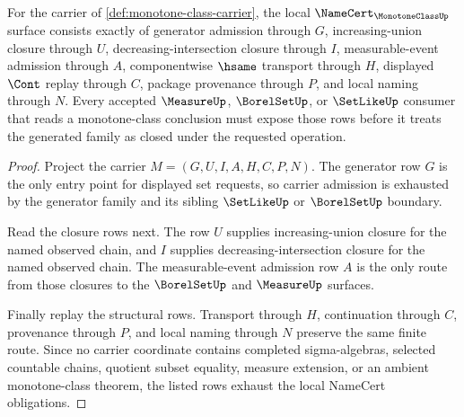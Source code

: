 \begin{theorem}
\label{thm:monotone-class-namecert-obligations}
For the carrier of \autoref{def:monotone-class-carrier}, the local $\NameCert_{\MonotoneClassUp}$ surface consists exactly of generator admission through $G$, increasing-union closure through $U$, decreasing-intersection closure through $I$, measurable-event admission through $A$, componentwise $\hsame$ transport through $H$, displayed $\Cont$ replay through $C$, package provenance through $P$, and local naming through $N$. Every accepted $\MeasureUp$, $\BorelSetUp$, or $\SetLikeUp$ consumer that reads a monotone-class conclusion must expose those rows before it treats the generated family as closed under the requested operation.
\end{theorem}
\begin{proof}
Project the carrier $M=(G,U,I,A,H,C,P,N)$. The generator row $G$ is the only entry point for displayed set requests, so carrier admission is exhausted by the generator family and its sibling $\SetLikeUp$ or $\BorelSetUp$ boundary.

Read the closure rows next. The row $U$ supplies increasing-union closure for the named observed chain, and $I$ supplies decreasing-intersection closure for the named observed chain. The measurable-event admission row $A$ is the only route from those closures to the $\BorelSetUp$ and $\MeasureUp$ surfaces.

Finally replay the structural rows. Transport through $H$, continuation through $C$, provenance through $P$, and local naming through $N$ preserve the same finite route. Since no carrier coordinate contains completed sigma-algebras, selected countable chains, quotient subset equality, measure extension, or an ambient monotone-class theorem, the listed rows exhaust the local NameCert obligations.
\end{proof}

